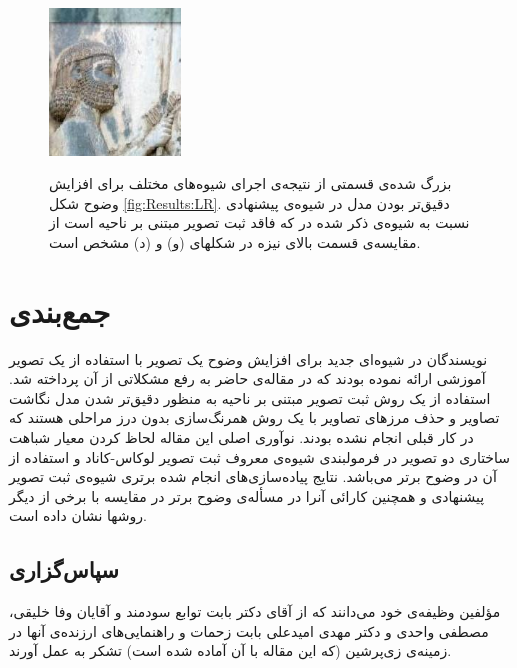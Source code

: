 \documentclass[conference]{IEEEtran-ModifiedForMVIP}
\begin{document}
\begin{figure}[t!]
{\includegraphics[width=35mm]{Images/Kamandar_blend_FA-LM-SSIM_Cropped.jpg}}
\hspace{2mm}

\caption{بزرگ شده‌ی قسمتی از نتیجه‌ی اجرای شیوه‌های مختلف برای افزایش وضوح شکل \ref{fig:Results:LR}. دقیق‌تر بودن مدل در شیوه‌ی پیشنهادی نسبت به شیوه‌ی ذکر شده در \cite{Amintoosi08reconstruction} که فاقد ثبت تصویر مبتنی بر ناحیه است از مقایسه‌ی قسمت بالای نیزه در شکلهای (و) و (د) مشخص است.}
\label{fig:Katibeh} %
\end{figure}


\section{جمع‌بندی}\label{Sec:Conclusion}
نویسندگان در \cite{Amintoosi08reconstruction} شیوه‌ای جدید برای افزایش وضوح یک تصویر با استفاده از یک تصویر آموزشی ارائه نموده بودند که در مقاله‌ی حاضر به رفع مشکلاتی از آن پرداخته شد. استفاده از یک روش ثبت تصویر مبتنی بر ناحیه به منظور دقیق‌تر شدن مدل نگاشت تصاویر و حذف مرزهای تصاویر با یک روش همرنگ‌سازی بدون درز مراحلی هستند که در کار قبلی انجام نشده بودند. نوآوری اصلی این مقاله لحاظ کردن معیار شباهت ساختاری دو تصویر در فرمولبندی شیوه‌ی معروف ثبت تصویر لوکاس-کاناد و استفاده از آن در وضوح برتر می‌باشد. نتایج پیاده‌سازی‌های انجام شده برتری شیوه‌ی ثبت تصویر پیشنهادی و همچنین کارائی آنرا در مسأله‌ی وضوح برتر در مقایسه با برخی از دیگر روشها نشان داده است.

\subsection*{سپاس‌گزاری}
مؤلفین وظیفه‌ی خود می‌دانند که از آقای دکتر  بابت توابع سودمند  
و آقایان وفا خلیقی، مصطفی واحدی و دکتر مهدی امیدعلی بابت زحمات و راهنمایی‌های ارزنده‌ی آنها در زمینه‌ی
زی‌پرشین (که این مقاله با آن آماده شده است) تشکر به عمل آورند. 
\end{document}
